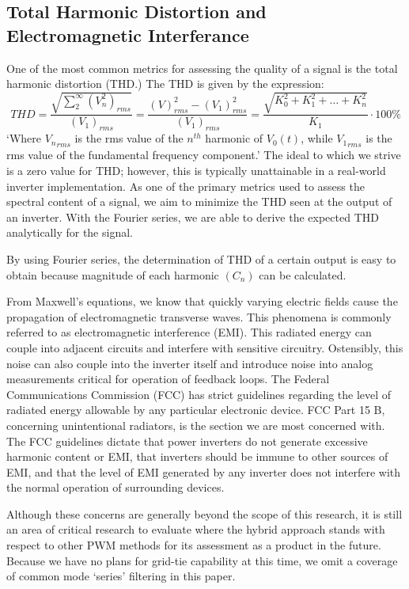 \subsection{Total Harmonic Distortion and Electromagnetic Interferance}
One of the most common metrics for assessing the quality of a signal is the total harmonic distortion (THD.) The THD is given by the expression:
\begin{equation}
THD=\frac{\sqrt{\sum_{2}^{\infty}(V_n^2)_{rms}}}{(V_1)_{rms}} = \frac{(V)_{rms}^2-(V_1)^2_{rms}}{(V_1)_{rms}} = \frac{\sqrt{K_0^2+K_1^2+\ldots+K_n^2}}{K_1}\cdot100\%
\end{equation} 
`Where ${V_n}_{rms}$ is the rms value of the $n^{th}$ harmonic of $V_0(t)$, while ${V_1}_{rms}$ is the rms value of the fundamental frequency component.'\cite{FourierAnalysis} The ideal to which we strive is a zero value for THD; however, this is typically unattainable in a real-world inverter implementation. As one of the primary metrics used to assess the spectral content of a signal, we aim to minimize the THD seen at the output of an inverter. With the Fourier series, we are able to derive the expected THD analytically for the signal.

By using Fourier series, the determination of THD of a certain output is easy to obtain because magnitude of each harmonic $(C_n)$ can be calculated.

From Maxwell's equations, we know that quickly varying electric fields cause the propagation of electromagnetic transverse waves. This phenomena is commonly referred to as electromagnetic interference (EMI). This radiated energy can couple into adjacent circuits and interfere with sensitive circuitry. Ostensibly, this noise can also couple into the inverter itself and introduce noise into analog measurements critical for operation of feedback loops. The Federal Communications Commission (FCC) has strict guidelines regarding the level of radiated energy allowable by any particular electronic device. FCC Part 15 B, concerning unintentional radiators, is the section we are most concerned with.  The FCC guidelines dictate that power inverters do not generate excessive harmonic content or EMI, that inverters should be immune to other sources of EMI, and that the level of EMI generated by any inverter does not interfere with the normal operation of surrounding devices. 

Although these concerns are generally beyond the scope of this research, it is still an area of critical research to evaluate where the hybrid approach stands with respect to other PWM methods for its assessment as a product in the future. Because we have no plans for grid-tie capability at this time, we omit a coverage of common mode `series' filtering in this paper.

